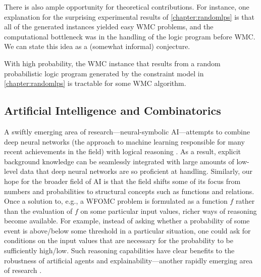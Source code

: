 There is also ample opportunity for theoretical contributions. For instance, one
explanation for the surprising experimental results of \cref{chapter:randomlps}
is that all of the generated instances yielded easy WMC problems, and the
computational bottleneck was in the handling of the logic program before WMC\@.
We can state this idea as a (somewhat informal) conjecture.

\begin{conjecture}
  With high probability, the WMC instance that results from a random
  probabilistic logic program generated by the constraint model in
  \cref{chapter:randomlps} is tractable for some WMC algorithm.
\end{conjecture}


\subsection{Artificial Intelligence and Combinatorics}

A swiftly emerging area of research---neural-symbolic AI---attempts to combine
deep neural networks (the approach to machine learning responsible for many
recent achievements in the field) with logical reasoning
\citep{DBLP:conf/ijcai/RaedtDMM20,garnelo2019reconciling,DBLP:series/faia/342}.
As a result, explicit background knowledge can be seamlessly integrated with
large amounts of low-level data that deep neural networks are so proficient at
handling. Similarly, our hope for the broader field of AI is that the field
shifts some of its focus from numbers and probabilities to structural concepts
such as functions and relations. Once a solution to, e.g., a WFOMC problem is
formulated as a function $f$ rather than the evaluation of $f$ on some
particular input values, richer ways of reasoning become available. For example,
instead of asking whether a probability of some event is above/below some
threshold in a particular situation, one could ask for conditions on the input
values that are necessary for the probability to be sufficiently high/low. Such
reasoning capabilities have clear benefits to the robustness of artificial
agents and explainability---another rapidly emerging area of research
\citep{DBLP:journals/corr/abs-1909-03012,DBLP:journals/fdata/BelleP21,DBLP:journals/corr/abs-2202-10335}.


